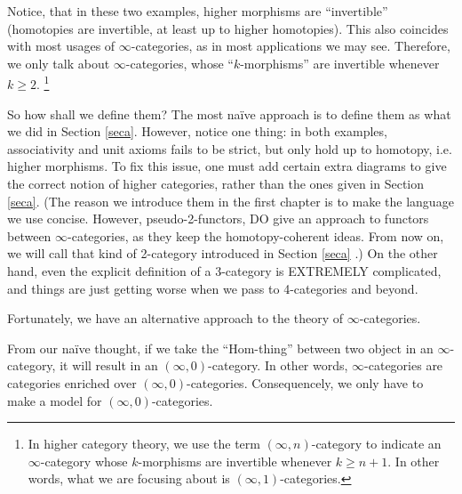 
Notice, that in these two examples, higher morphisms are ``invertible'' (homotopies are invertible, at least up to higher homotopies).
This also coincides with most usages of $\infty$-categories, as in most applications we may see. Therefore, we only talk about
$\infty$-categories, whose ``$k$-morphisms'' are invertible whenever $k\ge 2$. \footnote{In higher category theory, we use 
the term $(\infty,n)$-category to indicate an $\infty$-category whose $k$-morphisms are invertible whenever $k\ge n+1$. In other words,
what we are focusing about is $(\infty,1)$-categories.}

So how shall we define them? The most na\"ive approach is to define them as what we did in Section \ref{seca}. However, notice one thing: 
in both examples, associativity and unit axioms fails to be strict, but only hold up to homotopy, i.e. higher morphisms. To fix this issue,
one must add certain extra diagrams to give the correct notion of higher categories, rather than the ones given in Section \ref{seca}.
(The reason we introduce them in the first chapter is to make the language we use concise. However, pseudo-2-functors, DO give an approach to
functors between $\infty$-categories, as they keep the homotopy-coherent ideas. From now on, we will call that kind of 2-category
introduced in Section \ref{seca} .) On the other hand, even the explicit definition of a 3-category 
is EXTREMELY complicated, and things are just getting worse when we pass to 4-categories and beyond.

Fortunately, we have an alternative approach to the theory of $\infty$-categories.

From our na\"ive thought, if we take the ``Hom-thing'' between two object in an $\infty$-category, it will result in an $(\infty,0)$-category.
In other words, $\infty$-categories are categories enriched over $(\infty,0)$-categories. Consequencely, we only have to make a model for
$(\infty,0)$-categories.

